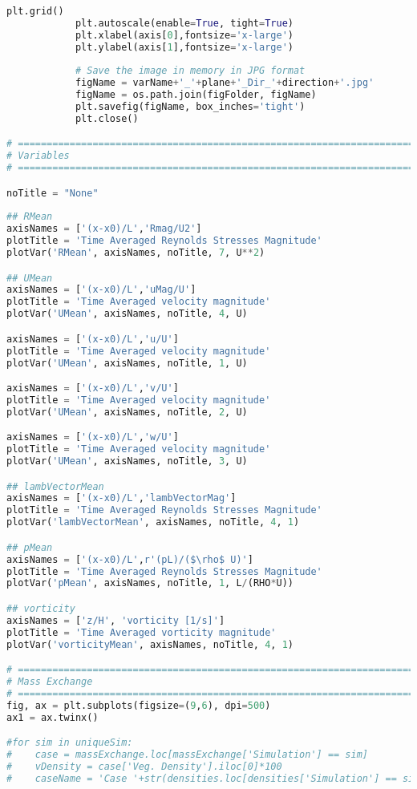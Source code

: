\begin{lstlisting}[language=python]
            plt.grid()
            plt.autoscale(enable=True, tight=True)
            plt.xlabel(axis[0],fontsize='x-large')
            plt.ylabel(axis[1],fontsize='x-large')
            
            # Save the image in memory in JPG format
            figName = varName+'_'+plane+'_Dir_'+direction+'.jpg'
            figName = os.path.join(figFolder, figName)
            plt.savefig(figName, box_inches='tight')
            plt.close()

# =============================================================================
# Variables
# =============================================================================

noTitle = "None"
            
## RMean
axisNames = ['(x-x0)/L','Rmag/U2']
plotTitle = 'Time Averaged Reynolds Stresses Magnitude'
plotVar('RMean', axisNames, noTitle, 7, U**2)

## UMean
axisNames = ['(x-x0)/L','uMag/U']
plotTitle = 'Time Averaged velocity magnitude'
plotVar('UMean', axisNames, noTitle, 4, U)

axisNames = ['(x-x0)/L','u/U']
plotTitle = 'Time Averaged velocity magnitude'
plotVar('UMean', axisNames, noTitle, 1, U)

axisNames = ['(x-x0)/L','v/U']
plotTitle = 'Time Averaged velocity magnitude'
plotVar('UMean', axisNames, noTitle, 2, U)

axisNames = ['(x-x0)/L','w/U']
plotTitle = 'Time Averaged velocity magnitude'
plotVar('UMean', axisNames, noTitle, 3, U)

## lambVectorMean
axisNames = ['(x-x0)/L','lambVectorMag']
plotTitle = 'Time Averaged Reynolds Stresses Magnitude'
plotVar('lambVectorMean', axisNames, noTitle, 4, 1)

## pMean
axisNames = ['(x-x0)/L',r'(pL)/($\rho$ U)']
plotTitle = 'Time Averaged Reynolds Stresses Magnitude'
plotVar('pMean', axisNames, noTitle, 1, L/(RHO*U))

## vorticity
axisNames = ['z/H', 'vorticity [1/s]']
plotTitle = 'Time Averaged vorticity magnitude'
plotVar('vorticityMean', axisNames, noTitle, 4, 1)

# =============================================================================
# Mass Exchange
# =============================================================================
fig, ax = plt.subplots(figsize=(9,6), dpi=500)
ax1 = ax.twinx()

#for sim in uniqueSim:
#    case = massExchange.loc[massExchange['Simulation'] == sim]
#    vDensity = case['Veg. Density'].iloc[0]*100
#    caseName = 'Case '+str(densities.loc[densities['Simulation'] == sim].index[0])
    

\end{lstlisting}
